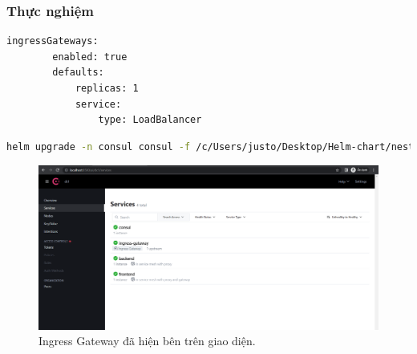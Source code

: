 \documentclass[12pt,a4paper]{report}
\begin{document}
	\subsubsection{Thực nghiệm}
	\hspace{1.0cm}{Đầu tiên, để tạo ra ingress gateway, thì chúng ta cần cập nhật tệp tin values.yaml ở phần các bước triển khai. Chúng ta sẽ thêm vào một phần sau vào bên dưới tệp:}
	\begin{lstlisting}[language=Bash]
	ingressGateways:
		enabled: true
		defaults:
			replicas: 1	
			service:
				type: LoadBalancer
	\end{lstlisting}
	\hspace{1.0cm}{Sau khi thêm vào, chúng ta sẽ chạy câu lệnh sau để update chart của Consul}
	\begin{lstlisting}[language=Bash]
	helm upgrade -n consul consul -f /c/Users/justo/Desktop/Helm-chart/nestjs-helm/consul/helm/values.yaml hashicorp/consul
	\end{lstlisting}
	\hspace{1.0cm}{Sau khi helm upgrade xong chart, thì chúng ta sẽ truy cập vào giao diện của Consul và xem kết quả:}
	\pagebreak
	\begin{figure}[h]
	\centering
	\includegraphics[width=1\linewidth]{Pics/localhost-8500}
	\caption{\label{fig:localhost-8500} Ingress Gateway đã hiện bên trên giao diện.}
	\label{fig:localhost-8500}
	\end{figure}
\end{document}
